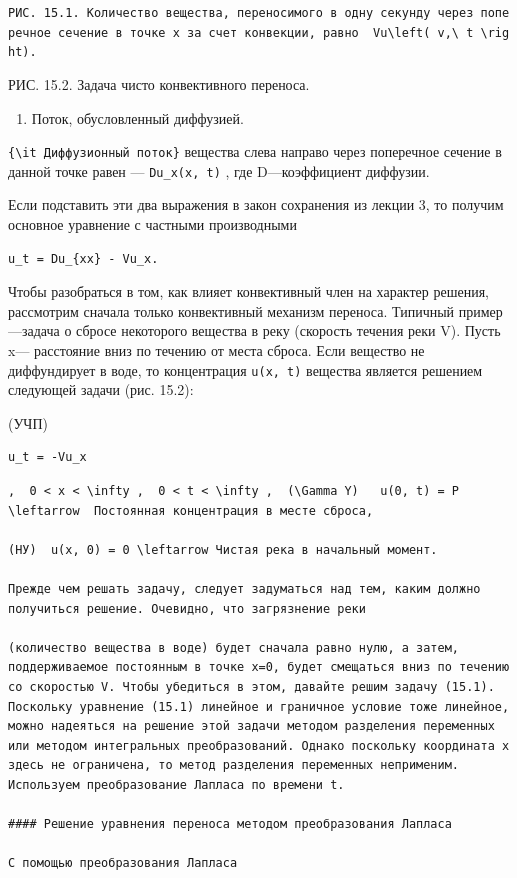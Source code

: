 \documentclass[
  ukrainian,
]{article}
\providecommand{\tightlist}{%
  \setlength{\itemsep}{0pt}\setlength{\parskip}{0pt}}
\begin{document}
\texttt{РИС.\ 15.1.\ Количество\ вещества,\ переносимого\ в\ одну\ секунду\ через\ поперечное\ сечение\ в\ точке\ x\ за\ счет\ конвекции,\ равно\ \ \textquotesingle{}Vu\textbackslash{}left(\ v,\textbackslash{}\ t\ \textbackslash{}right).\textquotesingle{}}

РИС. 15.2. Задача чисто конвективного переноса.

\begin{enumerate}
\def\labelenumi{\arabic{enumi}.}
\setcounter{enumi}{1}
\tightlist
\item
  Поток, обусловленный диффузией.
\end{enumerate}

\texttt{\{\textbackslash{}it\ Диффузионный\ поток\}} вещества слева
направо через поперечное сечение в данной точке равен ---
\texttt{Du\_x(x,\ t)} , где D---коэффициент диффузии.

Если подставить эти два выражения в закон сохранения из лекции 3, то
получим основное уравнение с частными производными

\begin{verbatim}
u_t = Du_{xx} - Vu_x.
\end{verbatim}

Чтобы разобраться в том, как влияет конвективный член на характер
решения, рассмотрим сначала только конвективный механизм переноса.
Типичный пример---задача о сбросе некоторого вещества в реку (скорость
течения реки V). Пусть x--- расстояние вниз по течению от места сброса.
Если вещество не диффундирует в воде, то концентрация \texttt{u(x,\ t)}
вещества является решением следующей задачи (рис. 15.2):

(УЧП)

\begin{verbatim}
u_t = -Vu_x
\end{verbatim}

\begin{verbatim}
,  0 < x < \infty ,  0 < t < \infty ,  (\Gamma Y)   u(0, t) = P \leftarrow  Постоянная концентрация в месте сброса,

(НУ)  u(x, 0) = 0 \leftarrow Чистая река в начальный момент.

Прежде чем решать задачу, следует задуматься над тем, каким должно получиться решение. Очевидно, что загрязнение реки

(количество вещества в воде) будет сначала равно нулю, а затем, поддерживаемое постоянным в точке x=0, будет смещаться вниз по течению со скоростью V. Чтобы убедиться в этом, давайте решим задачу (15.1). Поскольку уравнение (15.1) линейное и граничное условие тоже линейное, можно надеяться на решение этой задачи методом разделения переменных или методом интегральных преобразований. Однако поскольку координата x здесь не ограничена, то метод разделения переменных неприменим. Используем преобразование Лапласа по времени t.

#### Решение уравнения переноса методом преобразования Лапласа

С помощью преобразования Лапласа
\end{verbatim}
\end{document}
